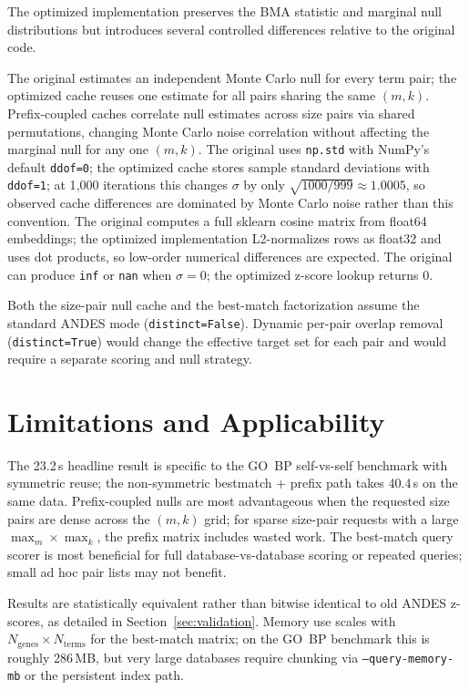 \documentclass[11pt,a4paper]{article}
\begin{document}
The optimized implementation preserves the BMA statistic and marginal null
distributions but introduces several controlled differences relative to the
original code.

The original estimates an independent Monte Carlo null for every term pair;
the optimized cache reuses one estimate for all pairs sharing the same
$(m,k)$. Prefix-coupled caches correlate null estimates across size pairs via
shared permutations, changing Monte Carlo noise correlation without affecting
the marginal null for any one $(m,k)$. The original uses \texttt{np.std}
with NumPy's default \texttt{ddof=0}; the optimized cache stores sample
standard deviations with \texttt{ddof=1}; at 1{,}000 iterations this changes
$\sigma$ by only $\sqrt{1000/999} \approx 1.0005$, so observed cache
differences are dominated by Monte Carlo noise rather than this convention.
The original computes a full sklearn cosine matrix from float64 embeddings;
the optimized implementation L2-normalizes rows as float32 and uses dot
products, so low-order numerical differences are expected. The original can
produce \texttt{inf} or \texttt{nan} when $\sigma = 0$; the optimized
z-score lookup returns 0.

Both the size-pair null cache and the best-match factorization assume the
standard ANDES mode (\texttt{distinct=False}). Dynamic per-pair overlap
removal (\texttt{distinct=True}) would change the effective target set for
each pair and would require a separate scoring and null strategy.

\section{Limitations and Applicability}

The 23.2\,s headline result is specific to the GO~BP self-vs-self benchmark
with symmetric reuse; the non-symmetric bestmatch + prefix path takes 40.4\,s
on the same data. Prefix-coupled nulls are most advantageous when the
requested size pairs are dense across the $(m,k)$ grid; for sparse size-pair
requests with a large $\max_m \times \max_k$, the prefix matrix includes
wasted work. The best-match query scorer is most beneficial for full
database-vs-database scoring or repeated queries; small ad hoc pair lists
may not benefit.

Results are statistically equivalent rather than bitwise identical to old
ANDES z-scores, as detailed in Section~\ref{sec:validation}. Memory use
scales with $N_\text{genes} \times N_\text{terms}$ for the best-match
matrix; on the GO~BP benchmark this is roughly 286\,MB, but very large
databases require chunking via \texttt{--query-memory-mb} or the persistent
index path.
\end{document}
